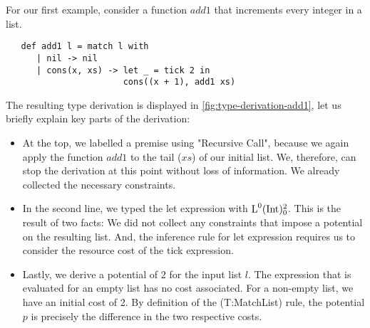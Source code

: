 \begin{example}
   For our first example, consider a function \(add1\) that increments every integer in a list.

\begin{verbatim}
   def add1 l = match l with 
      | nil -> nil
      | cons(x, xs) -> let _ = tick 2 in 
                       cons((x + 1), add1 xs)
\end{verbatim}

\newpage

The resulting type derivation is displayed in \cref{fig:type-derivation-add1}, let us briefly explain key parts of the derivation:

\begin{itemize}
   \item At the top, we labelled a premise using "Recursive Call", because we again apply the function \(add1\) to the tail (\(xs\)) of our initial list. We, therefore, can stop the derivation at this point without loss of information. We already collected the necessary constraints.

   \item In the second line, we typed the let expression with \(\text{L}^{0}(\text{Int}) ^{2}_{0}\). This is the result of two facts: We did not collect any constraints that impose a potential on the resulting list. And, the inference rule for let expression requires us to consider the resource cost of the tick expression. 

   \item Lastly, we derive a potential of \(2\) for the input list \(l\). The expression that is evaluated for an empty list has no cost associated. For a non-empty list, we have an initial cost of 2. By definition of the (T:MatchList) rule, the potential \(p\) is precisely the difference in the two respective costs.
\end{itemize}


\end{example}
